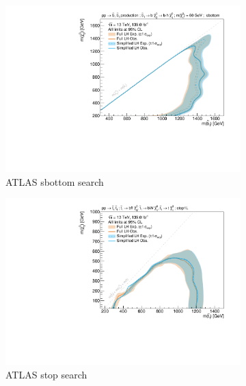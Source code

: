 \begin{figure}
	\centering
	\begin{subfigure}[b]{0.5\textwidth}
		\centering\includegraphics[width=\textwidth]{exclusion_sbottom_noLabel}
		\caption{ATLAS sbottom search~\cite{SUSY-2018-31}\label{fig:results_sbottom}}
	\end{subfigure}\hfill
	\begin{subfigure}[b]{0.5\textwidth}
		\centering\includegraphics[width=\textwidth]{exclusion_stop1L_noLabel}
		\caption{ATLAS stop search\label{fig:results_stop1L}}
	\end{subfigure}\hfill
	\begin{subfigure}[b]{0.5\textwidth}

\end{subfigure}
\end{figure}
